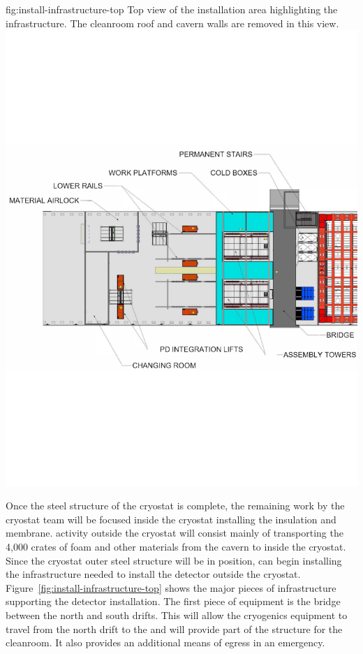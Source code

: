 \begin{dunefigure}{fig:install-infrastructure-top}
  {Top view of the installation area highlighting the infrastructure. The cleanroom roof and cavern walls are removed in this view.}
\includegraphics[width=.85\textwidth,trim=0mm 70mm 0mm 70mm,clip]{graphics/install-infrastructure-top-small.pdf} %
\end{dunefigure}

Once the steel structure of the cryostat is complete, the remaining work by the  cryostat team will be focused inside the cryostat installing the insulation and membrane.  
 activity outside the cryostat will consist mainly of
transporting the 4,000 crates of foam and other materials from the cavern to inside the cryostat. 
Since the cryostat outer steel structure will be in position,  can 
begin installing the infrastructure needed to install the detector outside the cryostat. 
Figure~\ref{fig:install-infrastructure-top} shows the major pieces of infrastructure supporting the detector installation.
The first piece of equipment is the bridge between the north and south drifts. 
This will allow the cryogenics equipment to travel from the north drift to the  and will provide part of the structure for the cleanroom. It also provides an additional means of egress in an emergency. %

